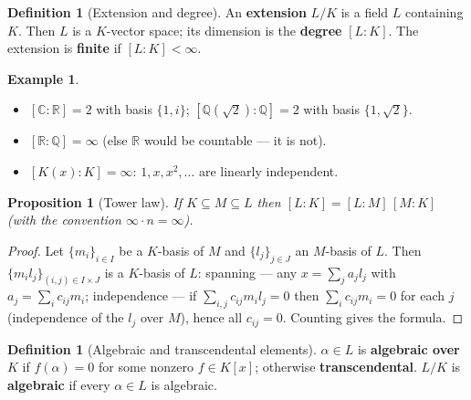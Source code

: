 \documentclass[11pt,a4paper]{article}
\newtheorem{proposition}[theorem]{Proposition}
\theoremstyle{definition}
\newtheorem{definition}[theorem]{Definition}
\newtheorem{example}[theorem]{Example}
\newcommand{\Q}{\mathbb{Q}}
\newcommand{\R}{\mathbb{R}}
\newcommand{\C}{\mathbb{C}}
\begin{document}
\begin{definition}[Extension and degree]
An \textbf{extension} $L/K$ is a field $L$ containing $K$. Then $L$ is a $K$-vector space; its
dimension is the \textbf{degree} $[L:K]$. The extension is \textbf{finite} if $[L:K]<\infty$.
\end{definition}

\begin{example}\label{ex:degrees}
\begin{itemize}
  \item $[\C:\R]=2$ with basis $\{1,i\}$; $[\Q(\sqrt2):\Q]=2$ with basis $\{1,\sqrt2\}$.
  \item $[\R:\Q]=\infty$ (else $\R$ would be countable --- it is not).
  \item $[K(x):K]=\infty$: $1,x,x^2,\dots$ are linearly independent.
\end{itemize}
\end{example}

\begin{proposition}[Tower law]\label{prop:tower}
If $K\subseteq M\subseteq L$ then $[L:K]=[L:M]\,[M:K]$ (with the convention $\infty\cdot n=\infty$).
\end{proposition}
\begin{proof}
Let $\{m_i\}_{i\in I}$ be a $K$-basis of $M$ and $\{l_j\}_{j\in J}$ an $M$-basis of $L$. Then
$\{m_i l_j\}_{(i,j)\in I\times J}$ is a $K$-basis of $L$: spanning --- any $x=\sum_j a_j l_j$ with
$a_j=\sum_i c_{ij} m_i$; independence --- if $\sum_{i,j} c_{ij} m_i l_j=0$ then
$\sum_i c_{ij}m_i=0$ for each $j$ (independence of the $l_j$ over $M$), hence all $c_{ij}=0$.
Counting gives the formula.
\end{proof}

\begin{definition}[Algebraic and transcendental elements]
$\alpha\in L$ is \textbf{algebraic over $K$} if $f(\alpha)=0$ for some nonzero $f\in K[x]$;
otherwise \textbf{transcendental}. $L/K$ is \textbf{algebraic} if every $\alpha\in L$ is algebraic.
\end{definition}
\end{document}
